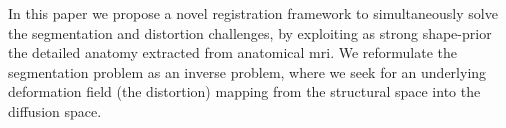 In this paper we propose a novel registration framework to simultaneously
solve the segmentation and distortion challenges, by exploiting as strong 
shape-prior the detailed anatomy extracted from anatomical \ac{mri}. 
We reformulate the segmentation problem as an inverse problem, where
we seek for an underlying deformation field (the distortion) mapping 
from the structural space into the diffusion space.